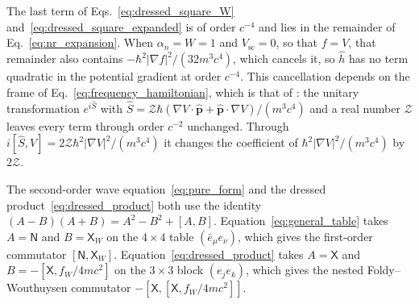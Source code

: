 \documentclass[aps,prd,onecolumn,tightenlines,nofootinbib,notitlepage,11pt,floatfix]{revtex4-2}
\theoremstyle{indentedtheorem}
\begin{document}
The last term of Eqs.~\eqref{eq:dressed_square_W} and~\eqref{eq:dressed_square_expanded} is of order $c^{-4}$ and lies in the remainder of Eq.~\eqref{eq:nr_expansion}. When $\alpha_n=W=1$ and $V_\text{sc}=0$, so that $f=V$, that remainder also contains $-\hbar^2|\nabla f|^2/(32m^3c^4)$, which cancels it, so $\hat{h}$ has no term quadratic in the potential gradient at order $c^{-4}$. This cancellation depends on the frame of Eq.~\eqref{eq:frequency_hamiltonian}, which is that of \citet{Eriksen1958Foldy}: the unitary transformation $e^{i\hat{S}}$ with $\hat{S} = \mathcal{Z}\hbar(\nabla V\cdot\hat{\mathbf{p}} + \hat{\mathbf{p}}\cdot\nabla V)/(m^3c^4)$ and a real number $\mathcal{Z}$ leaves every term through order $c^{-2}$ unchanged. Through $i[\hat{S},V] = 2\mathcal{Z}\hbar^2|\nabla V|^2/(m^3c^4)$ it changes the coefficient of $\hbar^2|\nabla V|^2/(m^3c^4)$ by $2\mathcal{Z}$.

The second-order wave equation~\eqref{eq:pure_form} and the dressed product~\eqref{eq:dressed_product} both use the identity $(A-B)(A+B) = A^2 - B^2 + [A,B]$. Equation~\eqref{eq:general_table} takes $A=\mathsf{N}$ and $B=\mathsf{X}_W$ on the $4\times 4$ table $(\bar{e}_\mu e_\nu)$, which gives the first-order commutator $[\mathsf{N},\mathsf{X}_W]$. Equation~\eqref{eq:dressed_product} takes $A=\mathsf{X}$ and $B=-[\mathsf{X},f_W/4mc^2]$ on the $3\times 3$ block $(e_j e_k)$, which gives the nested Foldy--Wouthuysen commutator $-[\mathsf{X},[\mathsf{X},f_W/4mc^2]]$.
\end{document}
